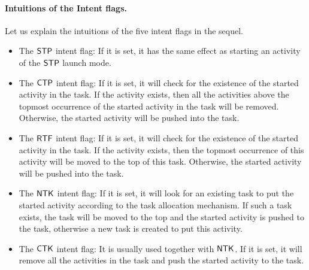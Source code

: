 \paragraph{Intuitions of the Intent flags.}  Let us explain the intuitions of the five intent flags in the sequel. 
\begin{itemize}
	\item The ${\sf STP}$ intent flag:  If it is set,  it has the same effect as starting an activity of the $\mathsf{STP}$ launch mode.
	\item The ${\sf CTP}$ intent flag:  If it is set, it will check for the existence of the started activity in the task. If the activity exists, then all the activities above the topmost occurrence of the started activity in the task will be removed. Otherwise, the started activity will be pushed into the task.
	\item The ${\sf RTF}$ intent flag:  If it is set, it will check for the existence of the started activity in the task. If the activity exists, then the topmost occurrence of this activity will be moved to the top of this task. Otherwise, the started activity will be pushed into the task.
	\item The ${\sf NTK}$ intent flag:  If it is set, it will look for an existing task to put the started activity according to the task allocation mechanism. If such a task exists, the task will be moved to the top and the started activity is pushed to the task, otherwise a new task is created to put this activity.
	\item The ${\sf CTK}$ intent flag:  It is usually used together with ${\sf NTK}$. If it is set, it will remove all the activities in the task and push the started activity to the task.
\end{itemize}



